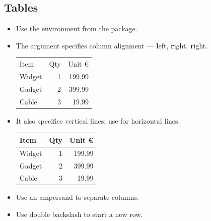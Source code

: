 \documentclass{beamer}
\begin{document}
\subsection*{Tables}
\begin{frame}[fragile]{\insertsubsection}
\begin{itemize}
\item Use the  environment from the  package.
\item The argument specifies column alignment --- \textbf{l}eft, \textbf{r}ight, \textbf{r}ight.
\begin{exampletwouptiny}
\begin{tabular}{lrr}
Item   & Qty & Unit \euro \\
Widget & 1   & 199.99  \\
Gadget & 2   & 399.99  \\
Cable  & 3   & 19.99   \\
\end{tabular}
\end{exampletwouptiny}
\item It also specifies vertical lines; use  for horizontal lines.
\begin{exampletwouptiny}
\begin{tabular}{|l|r|r|} \hline
Item   & Qty & Unit \euro \\\hline
Widget & 1   & 199.99  \\
Gadget & 2   & 399.99  \\
Cable  & 3   & 19.99   \\\hline
\end{tabular}
\end{exampletwouptiny}
\item Use an ampersand \keystrokebftt{\&} to separate columns.
\item Use double backslash \keystrokebftt{\bs}\keystrokebftt{\bs} to start a new row.
\end{itemize}
\end{frame}

\end{document}
